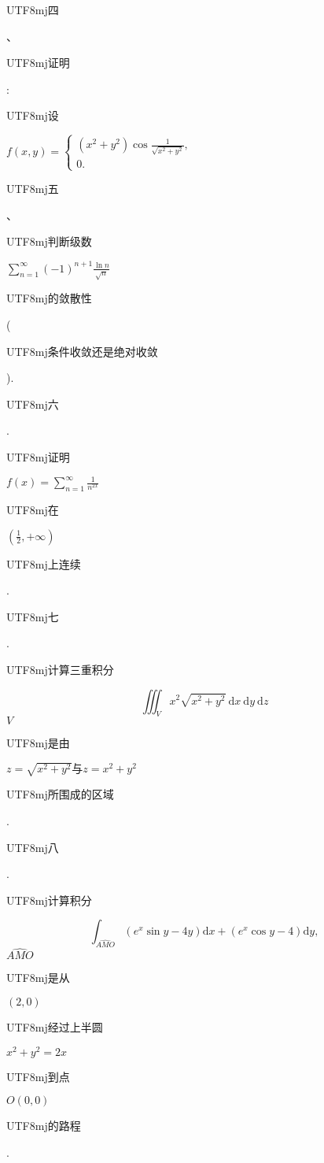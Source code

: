 \documentclass[10pt]{article}
\begin{document}
\begin{CJK}{UTF8}{mj}四\end{CJK}、\begin{CJK}{UTF8}{mj}证明\end{CJK}: \begin{CJK}{UTF8}{mj}设\end{CJK} $f(x, y)=\left\{\begin{array}{l}\left(x^{2}+y^{2}\right) \cos \frac{1}{\sqrt{x^{2}+y^{2}}}, \\ 0 .\end{array}\right.$

\begin{CJK}{UTF8}{mj}五\end{CJK}、\begin{CJK}{UTF8}{mj}判断级数\end{CJK} $\sum_{n=1}^{\infty}(-1)^{n+1} \frac{\ln n}{\sqrt{n}}$ \begin{CJK}{UTF8}{mj}的敛散性\end{CJK} (\begin{CJK}{UTF8}{mj}条件收敛还是绝对收敛\end{CJK}).

\begin{CJK}{UTF8}{mj}六\end{CJK}. \begin{CJK}{UTF8}{mj}证明\end{CJK} $f(x)=\sum_{n=1}^{\infty} \frac{1}{n^{2 x}}$ \begin{CJK}{UTF8}{mj}在\end{CJK} $\left(\frac{1}{2},+\infty\right)$ \begin{CJK}{UTF8}{mj}上连续\end{CJK}.

\begin{CJK}{UTF8}{mj}七\end{CJK}. \begin{CJK}{UTF8}{mj}计算三重积分\end{CJK}
$$
\iiint_{V} x^{2} \sqrt{x^{2}+y^{2}} \mathrm{~d} x \mathrm{~d} y \mathrm{~d} z
$$
$V$ \begin{CJK}{UTF8}{mj}是由\end{CJK} $z=\sqrt{x^{2}+y^{2}} 与 z=x^{2}+y^{2}$ \begin{CJK}{UTF8}{mj}所围成的区域\end{CJK}.

\begin{CJK}{UTF8}{mj}八\end{CJK}. \begin{CJK}{UTF8}{mj}计算积分\end{CJK}
$$
\int_{\widehat{A M O}}\left(e^{x} \sin y-4 y\right) \mathrm{d} x+\left(e^{x} \cos y-4\right) \mathrm{d} y,
$$
$\widehat{A M O}$ \begin{CJK}{UTF8}{mj}是从\end{CJK} $(2,0)$ \begin{CJK}{UTF8}{mj}经过上半圆\end{CJK} $x^{2}+y^{2}=2 x$ \begin{CJK}{UTF8}{mj}到点\end{CJK} $O(0,0)$ \begin{CJK}{UTF8}{mj}的路程\end{CJK}.
\end{document}
